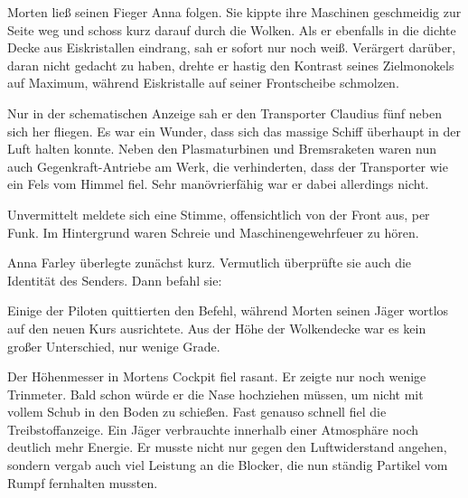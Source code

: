\par

Morten ließ seinen Fieger Anna folgen. Sie kippte ihre Maschinen geschmeidig zur Seite weg und schoss kurz darauf durch die Wolken. Als er ebenfalls in die dichte Decke aus Eiskristallen eindrang, sah er sofort nur noch weiß. Verärgert darüber, daran nicht gedacht zu haben, drehte er hastig den Kontrast seines Zielmonokels auf Maximum, während Eiskristalle auf seiner Frontscheibe schmolzen.

\par

Nur in der schematischen Anzeige sah er den Transporter Claudius fünf neben sich her fliegen. Es war ein Wunder, dass sich das massige Schiff überhaupt in der Luft halten konnte. Neben den Plasmaturbinen und Bremsraketen waren nun auch Gegenkraft-Antriebe am Werk, die verhinderten, dass der Transporter wie ein Fels vom Himmel fiel. Sehr manövrierfähig war er dabei allerdings nicht.

\par

Unvermittelt meldete sich eine Stimme, offensichtlich von der Front aus, per Funk.  Im Hintergrund waren Schreie und Maschinengewehrfeuer zu hören. 

\par

Anna Farley überlegte zunächst kurz. Vermutlich überprüfte sie auch die Identität des Senders. Dann befahl sie: 

\par

Einige der Piloten quittierten den Befehl, während Morten seinen Jäger wortlos auf den neuen Kurs ausrichtete. Aus der Höhe der Wolkendecke war es kein großer Unterschied, nur wenige Grade.

\par

Der Höhenmesser in Mortens Cockpit fiel rasant. Er zeigte nur noch wenige Trinmeter. Bald schon würde er die Nase hochziehen müssen, um nicht mit vollem Schub in den Boden zu schießen. Fast genauso schnell fiel die Treibstoffanzeige. Ein Jäger verbrauchte innerhalb einer Atmosphäre noch deutlich mehr Energie. Er musste nicht nur gegen den Luftwiderstand angehen, sondern vergab auch viel Leistung an die Blocker, die nun ständig Partikel vom Rumpf fernhalten mussten.

